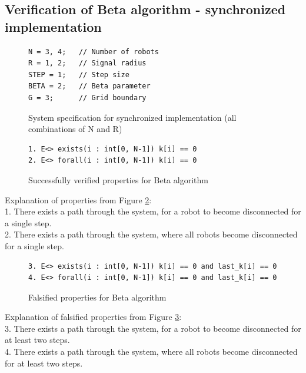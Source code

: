 \subsection{Verification of Beta algorithm - synchronized implementation}
\begin{figure}[H]
\caption{System specification for synchronized implementation (all combinations of N and R)}
\label{fig:algorithm_synchronised_system}
\begin{lstlisting}[style=code]
N = 3, 4;   // Number of robots
R = 1, 2;   // Signal radius
STEP = 1;   // Step size
BETA = 2;   // Beta parameter
G = 3;      // Grid boundary
\end{lstlisting}
\end{figure}

\begin{figure}[H]
\caption{Successfully verified properties for Beta algorithm}
\label{fig:algorithm_synchronised_properties_true}
\begin{lstlisting}[style=code]
1. E<> exists(i : int[0, N-1]) k[i] == 0
2. E<> forall(i : int[0, N-1]) k[i] == 0
\end{lstlisting}    
\end{figure}

\noindent
Explanation of properties from Figure \ref{fig:algorithm_synchronised_properties_true}:\\
1. There exists a path through the system, for a robot to become disconnected for a single step.\\
2. There exists a path through the system, where all robots become disconnected for a single step.\\

\begin{figure}[H]
\caption{Falsified properties for Beta algorithm}
\label{fig:algorithm_synchronised_properties_false}
\begin{lstlisting}[style=code]
3. E<> exists(i : int[0, N-1]) k[i] == 0 and last_k[i] == 0
4. E<> forall(i : int[0, N-1]) k[i] == 0 and last_k[i] == 0
\end{lstlisting}    
\end{figure}

\noindent
Explanation of falsified properties from Figure \ref{fig:algorithm_synchronised_properties_false}:\\
3. There exists a path through the system, for a robot to become disconnected for at least two steps.\\
4. There exists a path through the system, where all robots become disconnected for at least two steps.\\

